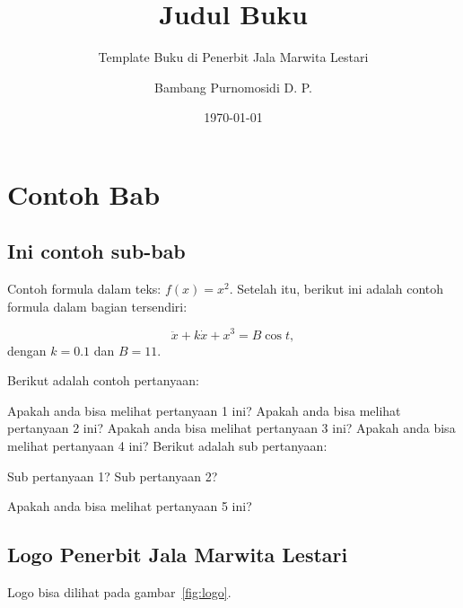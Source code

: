 \documentclass[oneside,a4paper,11pt,explicit]{book}
\title{Judul Buku}
\subtitle{Template Buku di Penerbit Jala Marwita Lestari}
\date{\today}
\author{Bambang Purnomosidi D. P.}
\begin{document}
\thispagestyle{empty}
\maketitle
\tableofcontents
{}
\listoffigures
{}
\listoftables
{}
\lstlistoflistings
\newpage
{}
\pagestyle{fancy}

\chapter{Contoh Bab}
\lipsum[1]

\section{Ini contoh sub-bab}
\lipsum[2]

Contoh formula dalam teks: $f(x) = x^2$. Setelah itu, berikut ini adalah contoh formula dalam bagian tersendiri:

\begin{equation}
\ddot{x}+k\dot{x}+x^3=B\cos t,
\end{equation}
dengan $k=0.1$ dan $B=11$. 

Berikut adalah contoh pertanyaan:

\begin{questions}
\question Apakah anda bisa melihat pertanyaan 1 ini?
\question Apakah anda bisa melihat pertanyaan 2 ini?
\question Apakah anda bisa melihat pertanyaan 3 ini?
\question Apakah anda bisa melihat pertanyaan 4 ini?
\question Berikut adalah sub pertanyaan:
\begin{tasks}
\task Sub pertanyaan 1?
\task Sub pertanyaan 2?
\end{tasks}
\question Apakah anda bisa melihat pertanyaan 5 ini?
\end{questions}

\section{Logo Penerbit Jala Marwita Lestari}
\lipsum[3] Logo bisa dilihat pada gambar~\ref{fig:logo}.
\end{document}
